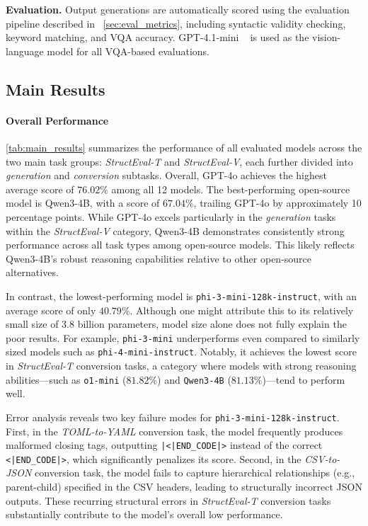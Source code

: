 \vspace{1mm}
\noindent\textbf{Evaluation.} Output generations are automatically scored using the evaluation pipeline described in ~\autoref{sec:eval_metrics}, including syntactic validity checking, keyword matching, and VQA accuracy. GPT-4.1-mini ~\citep{Hurst2024GPT4oSC} is used as the vision-language model for all VQA-based evaluations.

\subsection{Main Results}

\paragraph{Overall Performance}
\autoref{tab:main_results} summarizes the performance of all evaluated models across the two main task groups: \emph{StructEval-T} and \emph{StructEval-V}, each further divided into \emph{generation} and \emph{conversion} subtasks. Overall, GPT-4o achieves the highest average score of $76.02\%$ among all 12 models. The best-performing open-source model is Qwen3-4B, with a score of $67.04\%$, trailing GPT-4o by approximately 10 percentage points. While GPT-4o excels particularly in the \emph{generation} tasks within the \emph{StructEval-V} category, Qwen3-4B demonstrates consistently strong performance across all task types among open-source models. This likely reflects Qwen3-4B's robust reasoning capabilities relative to other open-source alternatives.

In contrast, the lowest-performing model is \texttt{phi-3-mini-128k-instruct}, with an average score of only $40.79\%$. Although one might attribute this to its relatively small size of 3.8 billion parameters, model size alone does not fully explain the poor results. For example, \texttt{phi-3-mini} underperforms even compared to similarly sized models such as \texttt{phi-4-mini-instruct}. Notably, it achieves the lowest score in \emph{StructEval-T} conversion tasks, a category where models with strong reasoning abilities—such as \texttt{o1-mini} ($81.82\%$) and \texttt{Qwen3-4B} ($81.13\%$)—tend to perform well.

Error analysis reveals two key failure modes for \texttt{phi-3-mini-128k-instruct}. First, in the \emph{TOML-to-YAML} conversion task, the model frequently produces malformed closing tags, outputting \texttt{|<|END\_CODE|>} instead of the correct \texttt{<|END\_CODE|>}, which significantly penalizes its score. Second, in the \emph{CSV-to-JSON} conversion task, the model fails to capture hierarchical relationships (e.g., parent-child) specified in the CSV headers, leading to structurally incorrect JSON outputs. These recurring structural errors in \emph{StructEval-T} conversion tasks substantially contribute to the model’s overall low performance.

